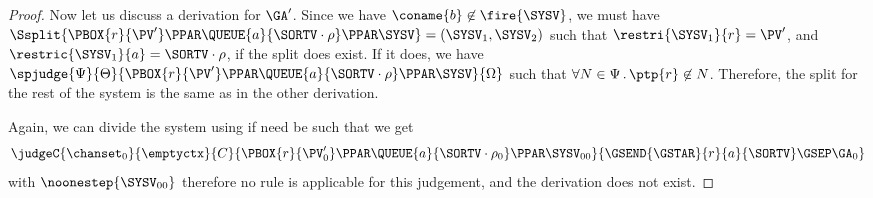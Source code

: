 \begin{proof}
Now let us discuss a derivation for $\GA'$.
Since we have  $\coname{b} \not\in \fire{\SYSV}$, we must have
$\Ssplit{\PBOX{r}{\PV'} \PPAR 
\QUEUE{a}{\SORTV \cdot \rho} \PPAR
\SYSV} = (\SYSV_1 , \SYSV_2)$ such that $\restri{\SYSV_1}{r} = \PV'$,
and $\restric{\SYSV_1}{a} = \SORTV \cdot \rho$,
if the split does exist.
If it does, we have
$\spjudge{\Psi}{\Theta}{\PBOX{r}{\PV'} \PPAR 
  \QUEUE{a}{\SORTV \cdot \rho}\PPAR
  \SYSV}{\Omega}$ such that $\forall N \in \Psi \, . \, \ptp{r} \not\in N$. Therefore, the
split for the rest of the system is the same as in the other derivation.

Again, we can divide the system using  if need be such that we get
\[
\judgeC{\chanset_0}{\emptyctx}{C}{
  \PBOX{r}{\PV'_0} \PPAR 
  \QUEUE{a}{\SORTV \cdot \rho_0} \PPAR
  \SYSV_{00}}{\GSEND{\GSTAR}{r}{a}{\SORTV} \GSEP \GA_0}
\]
with $\noonestep{\SYSV_{00}}$ therefore no rule is applicable for
this judgement, and the derivation does not exist.

\end{proof}




